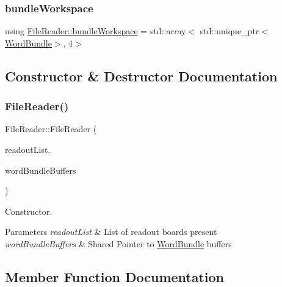 \subsubsection{\texorpdfstring{bundle\+Workspace}{bundleWorkspace}}
{\footnotesize\ttfamily using \hyperlink{class_file_reader_a7fb625dc45cee3256d37cc19c65cad86}{File\+Reader\+::bundle\+Workspace} =  std\+::array$<$ std\+::unique\+\_\+ptr$<$\hyperlink{class_word_bundle}{Word\+Bundle}$>$, 4$>$\hspace{0.3cm}{\ttfamily [private]}}



\subsection{Constructor \& Destructor Documentation}
\mbox{\label{class_file_reader_ae28a071d5fcba5b845ea3382a5cb2cfe}} 
\subsubsection{\texorpdfstring{File\+Reader()}{FileReader()}}
{\footnotesize\ttfamily File\+Reader\+::\+File\+Reader (\begin{DoxyParamCaption}\item[{const std\+::list$<$ \hyperlink{class_readout_identifier}{Readout\+Identifier} $>$ \&}]{readout\+List,  }\item[{std\+::array$<$ std\+::shared\+\_\+ptr$<$ \hyperlink{class_file_reader_ac755c1e271610c2c12a7fc5b55cc048b}{bundle\+Buffer} $>$, 4 $>$}]{word\+Bundle\+Buffers }\end{DoxyParamCaption})}



Constructor. 


\begin{DoxyParams}{Parameters}
{\em readout\+List} & List of readout boards present \\
\hline
{\em word\+Bundle\+Buffers} & Shared Pointer to \hyperlink{class_word_bundle}{Word\+Bundle} buffers \\
\hline
\end{DoxyParams}


\subsection{Member Function Documentation}
\mbox{\label{class_file_reader_a3404694daef538fdd001a3e2ae898fb8}} 
